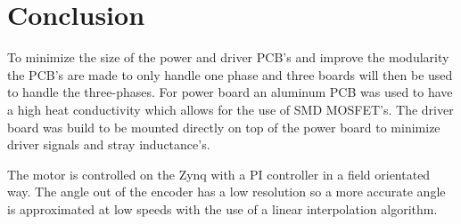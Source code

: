 \section{Conclusion}
\label{sec:conclusion}


To minimize the size of the power and driver PCB's and improve the modularity the PCB's are made to only handle one phase and three boards will then be used to handle the three-phases.
For power board an aluminum PCB was used to have a high heat conductivity which allows for the use of SMD MOSFET's. The driver board was build to be mounted directly on top of the power board to minimize driver signals and stray inductance's.

The motor is controlled on the Zynq with a PI controller in a field orientated way. 
The angle out of the encoder has a low resolution so a more accurate angle is approximated at low speeds with the use of a linear interpolation algorithm. 

